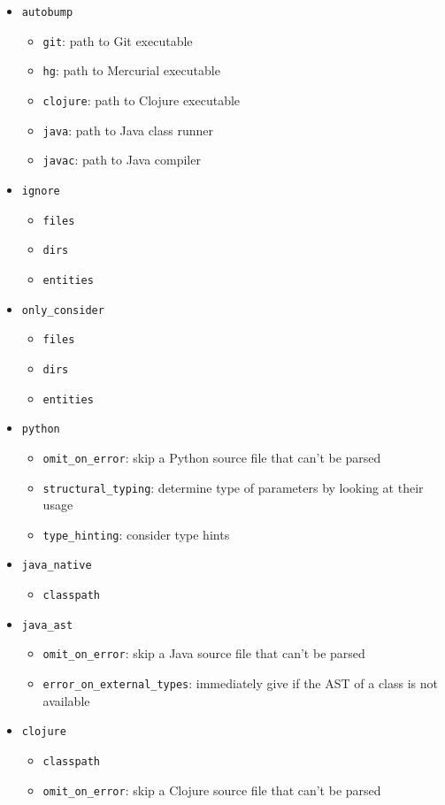 \documentclass{l4proj}
\newcommand\genericstyle{\lstset{basicstyle=\ttm}}
\newcommand\codeinline[1]{{\genericstyle\lstinline!#1!}}
\begin{document}
\begin{appendices}
\begin{itemize}
\item \codeinline{autobump}
\begin{itemize}
\item \codeinline{git}: path to Git executable
\item \codeinline{hg}: path to Mercurial executable
\item \codeinline{clojure}: path to Clojure executable
\item \codeinline{java}: path to Java class runner
\item \codeinline{javac}: path to Java compiler
\end{itemize}
\item \codeinline{ignore}
\begin{itemize}
\item \codeinline{files}
\item \codeinline{dirs}
\item \codeinline{entities}
\end{itemize}
\item \codeinline{only_consider}
\begin{itemize}
\item \codeinline{files}
\item \codeinline{dirs}
\item \codeinline{entities}
\end{itemize}
\item \codeinline{python}
\begin{itemize}
\item \codeinline{omit_on_error}: skip a Python source file that
can't be parsed
\item \codeinline{structural_typing}: determine type of parameters by
looking at their usage
\item \codeinline{type_hinting}: consider type hints
\end{itemize}
\item \codeinline{java_native}
\begin{itemize}
\item \codeinline{classpath}
\end{itemize}
\item \codeinline{java_ast}
\begin{itemize}
\item \codeinline{omit_on_error}: skip a Java source file that can't
be parsed
\item \codeinline{error_on_external_types}: immediately give if the
AST of a class is not available
\end{itemize}
\item \codeinline{clojure}
\begin{itemize}
\item \codeinline{classpath}
\item \codeinline{omit_on_error}: skip a Clojure source file that
can't be parsed
\end{itemize}
\end{itemize}


\end{appendices}
\end{document}
